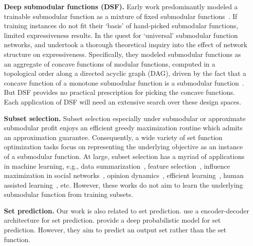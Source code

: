 \documentclass{article}
\newcommand{\xhdr}[1]{\noindent\textbf{#1.}}
\renewcommand{\cite}{\citep}
\begin{document}
\xhdr{Deep submodular functions (DSF)} 
Early work predominantly modeled a trainable submodular function as a mixture of fixed submodular functions~\cite{lin2012learning,tschiatschek2014learning}.
If training instances do not fit their `basis' of hand-picked submodular functions, limited expressiveness results.
In the quest for `universal' submodular function networks, \citet{bilmes2017deep} and \citet{bai2018submodular} undertook a thorough theoretical inquiry into the effect of network structure on expressiveness.  Specifically, they modeled submodular functions as an aggregate of concave functions of modular functions, computed in a topological order along a directed acyclic graph (DAG), driven by the fact that a concave function of a monotone submodular function is a submodular function~\cite{csm1, csm2, csm3}.
But DSF provides no practical prescription for  picking the concave functions. Each application of DSF will need an extensive search over these design spaces.

 
\xhdr{Subset selection} 
Subset selection especially under submodular or approximate submodular profit enjoys an efficient greedy maximization routine which admits an approximation guarantee.  Consequently, a wide variety of set function optimization tasks focus on representing the underlying objective as an instance of a submodular function.  At large, subset selection  has a myriad of applications in machine learning, e.g., data summarization~\cite{bairi2015summarization}, feature selection~\cite{khanna2017scalable}, influence maximization in social networks~\cite{kempe2003maximizing,de2018shaping,de2019learning,zarezade2017cheshire}, opinion dynamics~\cite{de2016learning,de2018demarcating,de2019learning,zhang2021learning,koley2021demarcating}, 
efficient learning~\cite{durga2021training,killamsetty2021grad}, human assisted learning~\cite{cuha,ruha,okati2021differentiable}, etc. However, these works do not aim to learn the underlying submodular function from training subsets. 

\xhdr{Set prediction} 
Our work is also related to set prediction.  \citet{zhang2019deep} use a encoder-decoder architecture for set prediction.  \citet{rezatofighi2020learn} provide a deep probabilistic model for set prediction. However, they aim to predict an output  set rather than the set function. 
\end{document}
